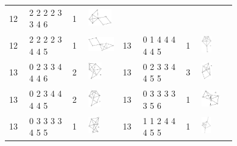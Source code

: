 \begin{footnotesize}
\begin{longtable}{
        m{0.05\linewidth} m{0.15\linewidth} m{0.05\linewidth} m{0.12\linewidth} |
        m{0.05\linewidth} m{0.15\linewidth} m{0.05\linewidth} m{0.12\linewidth}
    }
12 & 2 2 2 2 3 3 4 6 & 1 & \includegraphics[height=0.7151cm]{15-universal-graphs/img/degree-sequences-example-graphs/graph-4-8-25}\\
12 & 2 2 2 2 3 4 4 5 & 1 & \includegraphics[height=0.7151cm]{15-universal-graphs/img/degree-sequences-example-graphs/graph-4-8-26} &
13 & 0 1 4 4 4 4 4 5 & 1 & \includegraphics[height=0.7151cm]{15-universal-graphs/img/degree-sequences-example-graphs/graph-4-8-27}\\
13 & 0 2 3 3 4 4 4 6 & 2 & \includegraphics[height=0.7151cm]{15-universal-graphs/img/degree-sequences-example-graphs/graph-4-8-28} &
13 & 0 2 3 3 4 4 5 5 & 3 & \includegraphics[height=0.7151cm]{15-universal-graphs/img/degree-sequences-example-graphs/graph-4-8-29}\\
13 & 0 2 3 4 4 4 4 5 & 2 & \includegraphics[height=0.7151cm]{15-universal-graphs/img/degree-sequences-example-graphs/graph-4-8-30} &
13 & 0 3 3 3 3 3 5 6 & 1 & \includegraphics[height=0.7151cm]{15-universal-graphs/img/degree-sequences-example-graphs/graph-4-8-31}\\
13 & 0 3 3 3 3 4 5 5 & 1 & \includegraphics[height=0.7151cm]{15-universal-graphs/img/degree-sequences-example-graphs/graph-4-8-32} &
13 & 1 1 2 4 4 4 5 5 & 1 & \includegraphics[height=0.7151cm]{15-universal-graphs/img/degree-sequences-example-graphs/graph-4-8-33}\\

\end{longtable}
\end{footnotesize}
